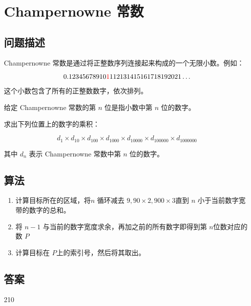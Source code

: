 \section{Champernowne 常数}
\subsection{问题描述}
\begin{tcolorbox}

	Champernowne 常数是通过将正整数序列连接起来构成的一个无限小数。例如：

	\[
		0.12345678910\textcolor{red}{1}112131415161718192021\ldots
	\]

	这个小数包含了所有的正整数数字，依次排列。

	给定 Champernowne 常数的第 \( n \) 位是指小数中第 \( n \) 位的数字。

	求出下列位置上的数字的乘积：

	\[
		d_1 \times d_{10} \times d_{100} \times d_{1000} \times d_{10000} \times d_{100000} \times d_{1000000}
	\]

	其中 \( d_n \) 表示 Champernowne 常数中第 \( n \) 位的数字。
\end{tcolorbox}

\subsection{算法}
\begin{enumerate}
	\item 计算目标所在的区域，将$ n $ 循环减去 \( 9, 90 \times 2, 900 \times 3 \)直到 \( n \) 小于当前数字宽带的数字的总和。
	\item 将 \( n  - 1\) 与当前的数字宽度求余，再加之前的所有数字即得到第 \( n \)位数对应的数 \( P \)
	\item 计算目标在 	\( P \)上的索引号，然后将其取出。
\end{enumerate}

\subsection{答案}
210
